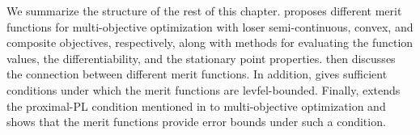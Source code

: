 \documentclass[../main]{subfiles}
\begin{document}
We summarize the structure of the rest of this chapter.
 proposes different merit functions for multi-objective optimization with loser semi-continuous, convex, and composite objectives, respectively, along with methods for evaluating the function values, the differentiability, and the stationary point properties.
 then discusses the connection between different merit functions.
In addition,  gives sufficient conditions under which the merit functions are levfel-bounded.
Finally,  extends the proximal-PL condition mentioned in  to multi-objective optimization and shows that the merit functions provide error bounds under such a condition.
\end{document}
